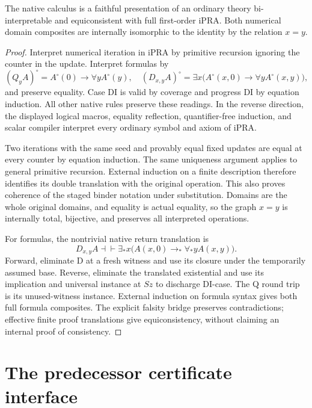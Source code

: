 \begin{theorem}
\label{up:biinterpretability}
The native calculus is a faithful presentation of an ordinary theory
bi-interpretable and equiconsistent with full first-order iPRA. Both
numerical domain composites are internally isomorphic to the identity by
the relation $x=y$.
\end{theorem}
\begin{proof}
Interpret numerical iteration in iPRA by primitive recursion ignoring the
counter in the update. Interpret formulas by
\[
 (Q_yA)^\circ=A^\circ(0)\to\forall y A^\circ(y),\quad
 (D_{x,y}A)^\circ=\exists x\bigl(A^\circ(x,0)\to\forall yA^\circ(x,y)\bigr),
\]
and preserve equality. Case DI is valid by coverage and progress DI by
equation induction. All other native rules preserve these readings.
In the reverse direction, the displayed logical macros, equality
reflection, quantifier-free induction, and scalar compiler interpret every
ordinary symbol and axiom of iPRA.

Two iterations with the same seed and provably equal fixed updates are
equal at every counter by equation induction. The same uniqueness argument
applies to general primitive recursion. External induction on a finite
description therefore identifies its double translation with the original
operation. This also proves coherence of the staged binder notation under
substitution. Domains are the whole original domains, and equality is
actual equality, so the graph $x=y$ is internally total, bijective, and
preserves all interpreted operations.

For formulas, the nontrivial native return translation is
\[
 D_{x,y}A\dashv\vdash
 \exists_*x\bigl(A(x,0)\to_*\forall_*y A(x,y)\bigr).
\]
Forward, eliminate D at a fresh witness and use its closure under the
temporarily assumed base. Reverse, eliminate the translated existential
and use its implication and universal instance at $Sz$ to discharge
DI-case. The Q round trip is its unused-witness instance. External induction
on formula syntax gives both full formula composites. The explicit falsity
bridge preserves contradictions; effective finite proof translations give
equiconsistency, without claiming an internal proof of consistency.
\end{proof}

\section{The predecessor certificate interface}
\label{sec:certificate-interface}

